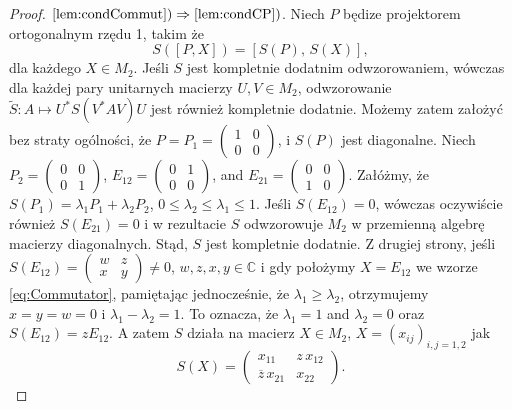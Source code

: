 \begin{proof}
$\ref{lem:condCommut}) \Rightarrow \ref{lem:condCP})$.
Niech $P$ będize projektorem ortogonalnym rzędu 1, takim że
\begin{equation}
\label{eq:Commutator}
S([P,X]) = [S(P), \, S(X)],
\end{equation}
dla każdego $X \in M_{2}$.
Jeśli $S$ jest kompletnie dodatnim odwzorowaniem, wówczas dla każdej pary
unitarnych macierzy $U, V \in M_{2}$,
odwzorowanie $\tilde{S}: A \mapsto U^{*} S(V^{*} A V) U$
jest również kompletnie dodatnie.
Możemy zatem założyć bez straty ogólności, że
$P = P_{1} =
\left(
\begin{smallmatrix} 1 & 0 \\ 0 & 0 \end{smallmatrix}
\right)$,
i $S(P)$ jest diagonalne.
Niech $P_{2} = \left(
\begin{smallmatrix} 0 & 0 \\ 0 & 1 \end{smallmatrix}
\right)$,
$E_{12} =
\left(
\begin{smallmatrix} 0 & 1 \\ 0 & 0 \end{smallmatrix}
\right)$,
and
$E_{21} =
\left(
\begin{smallmatrix} 0 & 0 \\ 1 & 0 \end{smallmatrix}
\right)$.
Załóżmy, że
$S(P_{1}) = \lambda_{1} P_{1} + \lambda_{2} P_{2}$,
$0 \leq \lambda_{2} \leq \lambda_{1} \leq 1$.
Jeśli $S(E_{12}) = 0$,
wówczas oczywiście również $S(E_{21}) = 0$ i w rezultacie
$S$ odwzorowuje $M_{2}$
w przemienną algebrę macierzy diagonalnych.
Stąd, $S$ jest kompletnie dodatnie.
Z drugiej strony, jeśli
$S(E_{12}) =
\left(
\begin{smallmatrix} w & z \\ x & y \end{smallmatrix}
\right) \neq 0$,
$w, z, x, y \in \mathbb{C}$
i gdy położymy $X = E_{12}$ we wzorze \eqref{eq:Commutator},
pamiętając jednocześnie, że $\lambda_{1} \geq \lambda_{2}$,
otrzymujemy $x = y = w = 0$ i $\lambda_{1} - \lambda_{2} = 1$.
To oznacza, że $\lambda_{1} = 1$ and $\lambda_{2} = 0$ oraz
$S(E_{12}) = z E_{12}$.
A zatem $S$ działa na macierz
$X \in M_{2}$, $X = (x_{ij})_{i,j=1,2}$ jak
\begin{equation}
S(X) = \begin{pmatrix}
 x_{11} & z \, x_{12} \\
\overline{z} \, x_{21} & x_{22}
\end{pmatrix}.
\end{equation}

\end{proof}
